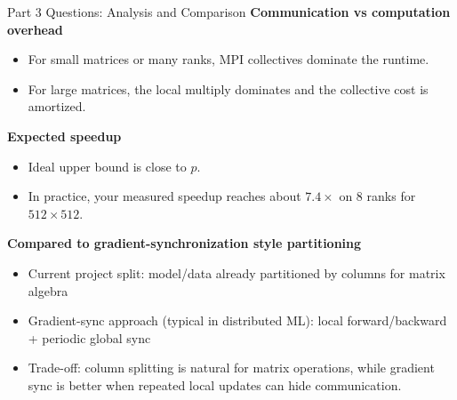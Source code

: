 \documentclass[aspectratio=169]{beamer}
\begin{document}
\begin{frame}{Part 3 Questions: Analysis and Comparison}
\textbf{Communication vs computation overhead}
\begin{itemize}
  \item For small matrices or many ranks, MPI collectives dominate the runtime.
  \item For large matrices, the local multiply dominates and the collective cost is amortized.
\end{itemize}

\textbf{Expected speedup}
\begin{itemize}
  \item Ideal upper bound is close to $p$.
  \item In practice, your measured speedup reaches about $7.4\times$ on 8 ranks for $512\times512$.
\end{itemize}

\textbf{Compared to gradient-synchronization style partitioning}
\begin{itemize}
  \item Current project split: model/data already partitioned by columns for matrix algebra
  \item Gradient-sync approach (typical in distributed ML): local forward/backward + periodic global sync
  \item Trade-off: column splitting is natural for matrix operations, while gradient sync is better when repeated local updates can hide communication.
\end{itemize}
\end{frame}
\end{document}
